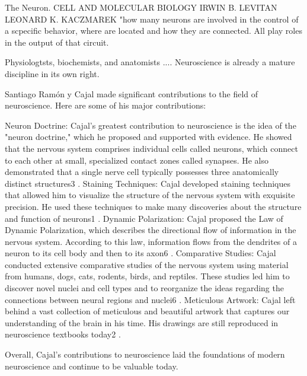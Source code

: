 
The Neuron. CELL AND MOLECULAR BIOLOGY
IRWIN B. LEVITAN
LEONARD K. KACZMAREK
"how many neurons are involved in the control of a scpecific behavior, where are located and how they are connected. 
All play roles in the output of that circuit. 

Physiologtsts, biochemists, and anatomists  .... Neuroscience is already a mature discipline in its own right. 



Santiago Ramón y Cajal made significant contributions to the field of neuroscience. Here are some of his major contributions:

    Neuron Doctrine: Cajal's greatest contribution to neuroscience is the idea of the "neuron doctrine," which he proposed and supported with evidence. He showed that the nervous system comprises individual cells called neurons, which connect to each other at small, specialized contact zones called synapses. He also demonstrated that a single nerve cell typically possesses three anatomically distinct structures3
    .
    Staining Techniques: Cajal developed staining techniques that allowed him to visualize the structure of the nervous system with exquisite precision. He used these techniques to make many discoveries about the structure and function of neurons1
    .
    Dynamic Polarization: Cajal proposed the Law of Dynamic Polarization, which describes the directional flow of information in the nervous system. According to this law, information flows from the dendrites of a neuron to its cell body and then to its axon6
    .
    Comparative Studies: Cajal conducted extensive comparative studies of the nervous system using material from humans, dogs, cats, rodents, birds, and reptiles. These studies led him to discover novel nuclei and cell types and to reorganize the ideas regarding the connections between neural regions and nuclei6
    .
    Meticulous Artwork: Cajal left behind a vast collection of meticulous and beautiful artwork that captures our understanding of the brain in his time. His drawings are still reproduced in neuroscience textbooks today2
    .

Overall, Cajal's contributions to neuroscience laid the foundations of modern neuroscience and continue to be valuable today.


